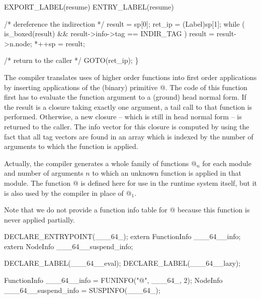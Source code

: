     EXPORT_LABEL(resume)
 ENTRY_LABEL(resume)

    /* dereference the indirection */
    result = sp[0];
    ret_ip = (Label)sp[1];
    while ( is_boxed(result) && result->info->tag == INDIR_TAG )
        result = result->n.node;
    *++sp = result;

    /* return to the caller */
    GOTO(ret_ip);
\}

\nwendcode{}\nwdocspar
The compiler translates uses of higher order functions into first
order applications by inserting applications of the (binary) primitive
{\Tt{}@\nwendquote}. The code of this function first has to evaluate the function
argument to a (ground) head normal form. If the result is a closure
taking exactly one argument, a tail call to that function is
performed. Otherwise, a new closure -- which is still in head normal
form -- is returned to the caller. The info vector for this closure
is computed by using the fact that all tag vectors are found in an
array which is indexed by the number of arguments to which the
function is applied.

Actually, the compiler generates a whole family of functions {\Tt{}@\nwendquote}$_n$
for each module and number of arguments $n$ to which an unknown
function is applied in that module. The function {\Tt{}@\nwendquote} is defined here
for use in the runtime system itself, but it is also used by the
compiler in place of {\Tt{}@\nwendquote}$_1$.

Note that we do not provide a function info table for {\Tt{}@\nwendquote} because
this function is never applied partially.

\nwenddocs{}\plusendmoddef\nwstartdeflinemarkup{}\nwenddeflinemarkup
DECLARE_ENTRYPOINT(___64_);
extern FunctionInfo ___64__info;
extern NodeInfo     ___64__suspend_info;

\nwendcode{}\nwdocspar
\nwenddocs{}\plusendmoddef\nwstartdeflinemarkup{}\nwenddeflinemarkup
DECLARE_LABEL(___64__eval);
DECLARE_LABEL(___64__lazy);

FunctionInfo ___64__info         = FUNINFO("@", ___64_, 2);
NodeInfo     ___64__suspend_info = SUSPINFO(___64_);

